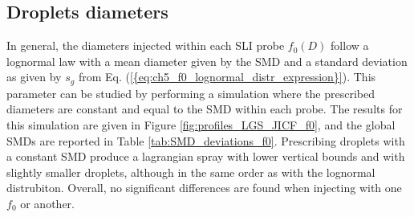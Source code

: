 \subsection{Droplets diameters}

In general, the diameters injected within each SLI probe $f_0 \left( D \right)$ follow a lognormal law with a mean diameter given by the SMD and a standard deviation as given by $s_g$ from Eq. (\ref{{eq:ch5_f0_lognormal_distr_expression}}). This parameter can be studied by performing a simulation where the prescribed diameters are constant and equal to the SMD within each probe. The results for this simulation are given in Figure \ref{fig:profiles_LGS_JICF_f0}, and the global SMDs are reported in Table \ref{tab:SMD_deviations_f0}. Prescribing droplets with a constant SMD produce a lagrangian spray with lower vertical bounds and with slightly smaller droplets, although in the same order as with the lognormal distrubiton. Overall, no significant differences are found when injecting with one $f_0$ or another. 

\clearpage

